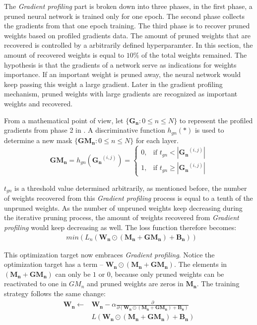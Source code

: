 \documentclass[a4paper,12pt]{report}
\begin{document}
The \textit{Gradient profiling} part is broken down into three phases, in the first phase, a pruned neural
network is trained only for one epoch.
The second phase collects the gradients from that one epoch training.
The third phase is to recover pruned weights based on profiled gradients data.
The amount of pruned weights that are recovered is controlled by a arbitrarily defined
hyperparamter.
In this section, the amount of recovered weights is equal to $10\%$ of the
total weights remained.
The hypothesis is that the gradients of a network serve as indications for
weights importance.
If an important weight is pruned away, the neural
network would keep passing this weight a large gradient.
Later in the gradient profiling mechanism, pruned weights with large gradients
are recognized as important weights and recovered.

From a mathematical point of view, let $\{\mathbf{G_n}: 0 \leq n \leq N\}$ to represent the
profiled gradients from phase 2 in .
A discriminative function $h_{gn}(*)$ is used to determine a new mask $\{\mathbf{GM_{n}}: 0 \leq n \leq N\}$
for each layer.
\begin{equation}
  \mathbf{GM_n} = h_{gn}(\mathbf{G_n}^{(i,j)}) =
  \begin{cases}
    0, &\text{if } t_{gn} < |\mathbf{G_n}^{(i,j)}| \\
    1, &\text{if } t_{gn} \geq |\mathbf{G_n}^{(i,j)}|
  \end{cases}
  \label{equ:gmfunc}
\end{equation}

$t_{gn}$ is a threshold value determined arbitrarily, as mentioned before,
the number of weights recovered from this \textit{Gradient profiling} process
is equal to a tenth of the unpruned weights.
As the number of unpruned weights keep decreasing during the iterative pruning
process, the amount of weights recovered from \textit{Gradient profiling} would
keep decreasing as well.
The loss function therefore becomes:
\begin{equation}
  \begin{aligned}
    & min(L_n(\mathbf{W_n} \odot (\mathbf{M_n} + \mathbf{GM_n}) + \mathbf{B_n}))
  \end{aligned}
  \label{equ:minfuncgp}
\end{equation}

This optimization target now embraces \textit{Gradient profiling}.
Notice the optimization target has a term -- $\mathbf{W_n} \odot (\mathbf{M_n} + \mathbf{GM_n})$.
The elements in $(\mathbf{M_n} + \mathbf{GM_n})$ can only be $1$ or $0$, because only pruned weights can be reactivated to one in $GM_n$
and pruned weights are zeros in $\mathbf{M_n}$.
The training strategy follows the same change:
\begin{equation}
  \begin{split}
    \mathbf{W_{n}} \leftarrow & \mathbf{W_{n}} - \alpha \frac{\partial}{\partial(\mathbf{W_n} \odot (\mathbf{M_n} + \mathbf{GM_n}) + \mathbf{B_n})}  \\
    & L(\mathbf{W_n} \odot (\mathbf{M_n} + \mathbf{GM_n}) + \mathbf{B_n})
  \end{split}
  \label{equ:trainfuncgp}
\end{equation}
\end{document}
